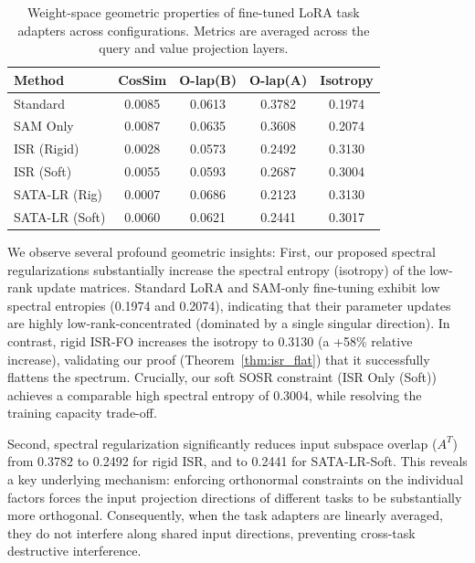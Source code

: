 \documentclass{article}
\begin{document}
\begin{table}[htbp]
\caption{Weight-space geometric properties of fine-tuned LoRA task adapters across configurations. Metrics are averaged across the query and value projection layers.}
\label{tab:subspace_analysis}
\vskip 0.15in
\begin{center}
\begin{small}
\begin{sc}
\setlength{\tabcolsep}{3pt}
\begin{tabular}{@{}lcccc@{}}
\toprule
Method & CosSim & O-lap(B) & O-lap(A) & Isotropy \\
\midrule
Standard & 0.0085 & 0.0613 & 0.3782 & 0.1974 \\
SAM Only & 0.0087 & 0.0635 & 0.3608 & 0.2074 \\
ISR (Rigid) & 0.0028 & 0.0573 & 0.2492 & 0.3130 \\
ISR (Soft) & 0.0055 & 0.0593 & 0.2687 & 0.3004 \\
SATA-LR (Rig) & 0.0007 & 0.0686 & 0.2123 & 0.3130 \\
SATA-LR (Soft) & 0.0060 & 0.0621 & 0.2441 & 0.3017 \\
\bottomrule
\end{tabular}
\end{sc}
\end{small}
\end{center}
\vskip -0.1in
\end{table}

We observe several profound geometric insights:
First, our proposed spectral regularizations substantially increase the spectral entropy (isotropy) of the low-rank update matrices. Standard LoRA and SAM-only fine-tuning exhibit low spectral entropies (0.1974 and 0.2074), indicating that their parameter updates are highly low-rank-concentrated (dominated by a single singular direction). In contrast, rigid ISR-FO increases the isotropy to 0.3130 (a +58\% relative increase), validating our proof (Theorem~\ref{thm:isr_flat}) that it successfully flattens the spectrum. Crucially, our soft SOSR constraint (ISR Only (Soft)) achieves a comparable high spectral entropy of 0.3004, while resolving the training capacity trade-off.

Second, spectral regularization significantly reduces input subspace overlap ($A^T$) from 0.3782 to 0.2492 for rigid ISR, and to 0.2441 for SATA-LR-Soft. This reveals a key underlying mechanism: enforcing orthonormal constraints on the individual factors forces the input projection directions of different tasks to be substantially more orthogonal. Consequently, when the task adapters are linearly averaged, they do not interfere along shared input directions, preventing cross-task destructive interference.
\end{document}
